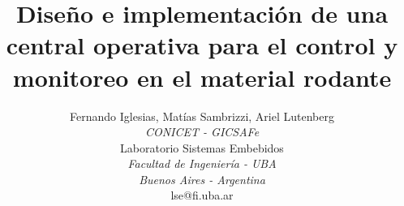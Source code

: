 \documentclass[a4paper]{IEEEtran}
\begin{document}
\title{Diseño e implementación de una central operativa para el control y monitoreo en el material rodante}


\author{

Fernando Iglesias, 
Matías Sambrizzi, 
Ariel Lutenberg \\

\normalsize \textit{CONICET - GICSAFe} \\
Laboratorio Sistemas Embebidos \\
\textit{Facultad de Ingeniería - UBA} \\
\textit{Buenos Aires - Argentina} \\
\textsuperscript{}\small lse@fi.uba.ar \\

}


\maketitle









\end{document}
